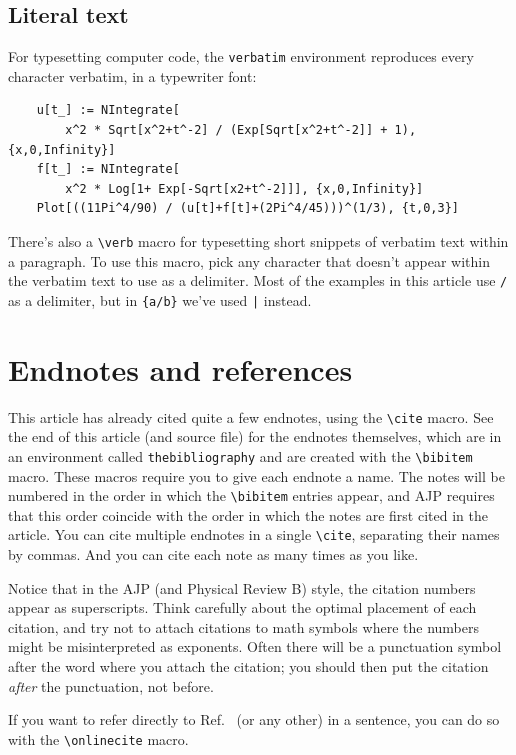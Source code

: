 \documentclass[prb,preprint]{revtex4-2}
\begin{document}
\subsection{Literal text}

For typesetting computer code, the \texttt{verbatim} environment reproduces
every character verbatim, in a typewriter font:
\begin{verbatim}
    u[t_] := NIntegrate[
        x^2 * Sqrt[x^2+t^-2] / (Exp[Sqrt[x^2+t^-2]] + 1), {x,0,Infinity}]
    f[t_] := NIntegrate[
        x^2 * Log[1+ Exp[-Sqrt[x2+t^-2]]], {x,0,Infinity}]
    Plot[((11Pi^4/90) / (u[t]+f[t]+(2Pi^4/45)))^(1/3), {t,0,3}]
\end{verbatim}
There's also a \verb/\verb/ macro for typesetting short snippets of verbatim
text within a paragraph. To use this macro, pick any character that doesn't
appear within the verbatim text to use as a delimiter. Most of the examples
in this article use \texttt{/} as a delimiter, but in \verb|{a/b}| we've used
\verb/|/ instead.


\section{Endnotes and references}

This article has already cited quite a few endnotes, using the \verb/\cite/
macro. See the end of this article (and source file) for the endnotes
themselves, which are in an environment called \texttt{thebibliography}
and are created with the \verb/\bibitem/ macro.  These macros require
you to give each endnote a name.  The notes will be numbered in the
order in which the \verb/\bibitem/ entries appear, and AJP requires that
this order coincide with the order in which the notes are first cited in 
the article.  You can cite multiple endnotes in a single \verb/\cite/, 
separating their names by commas.  And you can cite each note as many 
times as you like.

Notice that in the AJP (and Physical Review B) style, the citation numbers 
appear as superscripts. Think carefully about the optimal placement of
each citation, and try not to attach citations to math symbols where the
numbers might be misinterpreted as exponents. Often there will be a
punctuation symbol after the word where you attach the citation; you
should then put the citation \textit{after} the punctuation, not 
before.\cite{nevermindlogic}

If you want to refer directly to Ref.~ (or any other) 
in a sentence, you can do so with the \verb/\onlinecite/ macro.
\end{document}
